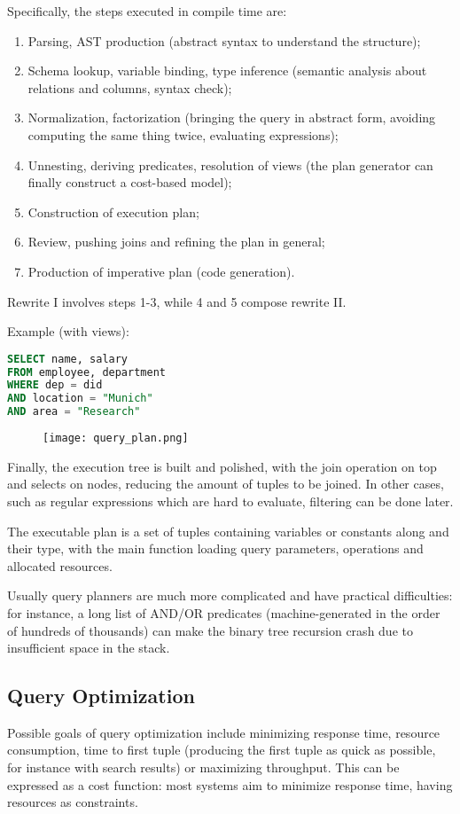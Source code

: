 Specifically, the steps executed in compile time are:
\begin{enumerate}
	\item Parsing, AST production (abstract syntax to understand the structure);
	\item Schema lookup, variable binding, type inference (semantic analysis about relations and columns, syntax check);
	\item Normalization, factorization (bringing the query in abstract form, avoiding computing the same thing twice, evaluating expressions);
	\item Unnesting, deriving predicates, resolution of views (the plan generator can finally construct a cost-based model);
	\item Construction of execution plan;
	\item Review, pushing joins and refining the plan in general;
	\item Production of imperative plan (code generation).
\end{enumerate}
Rewrite I involves steps 1-3, while 4 and 5 compose rewrite II.

Example (with views):
\begin{lstlisting}[language=SQL]
SELECT name, salary
FROM employee, department
WHERE dep = did
AND location = "Munich"
AND area = "Research"
\end{lstlisting}

\begin{figure}[h]
	\texttt{[image: query\_plan.png]}
	\centering
\end{figure}
Finally, the execution tree is built and polished, with the join operation on top and selects on nodes, reducing the amount of tuples to be joined. In other cases, such as regular expressions which are hard to evaluate, filtering can be done later.

The executable plan is a set of tuples containing variables or constants along and their type, with the main function loading query parameters, operations and allocated resources. 

Usually query planners are much more complicated and have practical difficulties: for instance, a long list of AND/OR predicates (machine-generated in the order of hundreds of thousands) can make the binary tree recursion crash due to insufficient space in the stack.

\subsection{Query Optimization}
Possible goals of query optimization include minimizing response time, resource consumption, time to first tuple (producing the first tuple as quick as possible, for instance with search results) or maximizing throughput. This can be expressed as a cost function: most systems aim to minimize response time, having resources as constraints.

